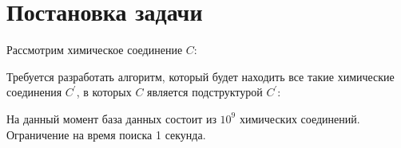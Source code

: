 \documentclass[12pt]{article}
\begin{document}
\newpage
\section{Постановка задачи}

Рассмотрим химическое соединение $C$:

\begin{figure}[h]
  \label{figure:target}
\end{figure}

Требуется разработать алгоритм, который будет находить все такие химические соединения $C^{'}$, в которых $C$ является подструктурой $C^{'}$:

\begin{figure}[h]
  \label{figure:result}
\end{figure}

На данный момент база данных состоит из $10^9$ химических соединений. Ограничение на время поиска 1 секунда.
\end{document}
